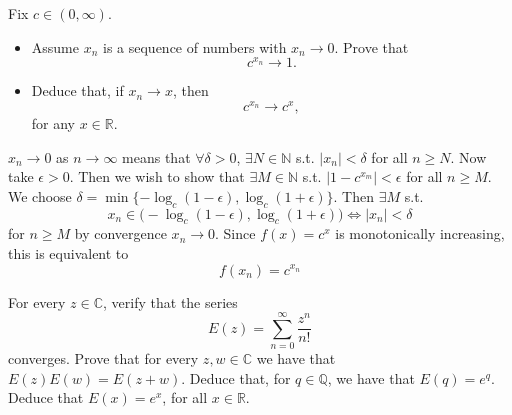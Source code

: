  \begin{exercise}
    Fix $c \in (0, \infty)$.
    \begin{itemize}
      \item Assume $x_n$ is a sequence of numbers with $x_n \to 0$. Prove that
        \begin{equation}
          c^{x_n} \to 1.
        \end{equation}
      
      \item Deduce that, if $x_n \to x$, then
        \begin{equation}
          c^{x_n} \to c^x,
        \end{equation}
        for any $x \in \mathbb{R}$.
    \end{itemize}
  \end{exercise}
  \begin{solution}
    $x_n \to 0$ as $n \to \infty$ means that $\forall \delta > 0$, $\exists N \in \mathbb{N}$ s.t. $|x_n| < \delta$ for all $n \geq N$. Now take $\epsilon > 0$. Then we wish to show that $\exists M \in \mathbb{N}$ s.t. $|1 - c^{x_m}| < \epsilon$ for all $n \geq M$. We choose $\delta = \min\{-\log_c (1 - \epsilon), \log_c (1 + \epsilon)\}$. Then $\exists M$ s.t. 
    \begin{equation}
      x_n \in \big( -\log_c (1 - \epsilon), \log_c (1 + \epsilon) \big) \iff |x_n| < \delta
    \end{equation}
    for $n \geq M$ by convergence $x_n \to 0$. Since $f(x) = c^x$ is monotonically increasing, this is equivalent to 
    \begin{equation}
      f(x_n) = c^{x_n}
    \end{equation}
  \end{solution}

  \begin{exercise}
    For every $z \in \mathbb{C}$, verify that the series
    \begin{equation}
      E(z) = \sum_{n=0}^{\infty} \frac{z^n}{n!}
    \end{equation}
    converges. Prove that for every $z, w \in \mathbb{C}$ we have that $E(z)E(w) = E(z + w)$. Deduce that, for $q \in \mathbb{Q}$, we have that $E(q) = e^q$. Deduce that $E(x) = e^x$, for all $x \in \mathbb{R}$.
  \end{exercise}
  \begin{solution}

  \end{solution}


